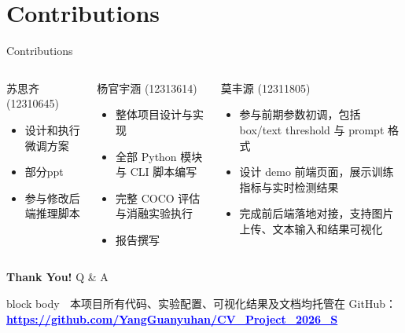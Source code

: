 \documentclass[aspectratio=169,10pt]{beamer}
\begin{document}
\section{Contributions}

\begin{frame}{Contributions}
  \begin{columns}[T]
    \begin{block}{苏思齐 (12310645)}
      \scriptsize
      \begin{itemize}\setlength{\itemsep}{2pt}
        \item 设计和执行微调方案
        \item 部分ppt
        \item 参与修改后端推理脚本
      \end{itemize}
    \end{block}

    \begin{block}{杨官宇涵 (12313614)}
      \scriptsize
      \begin{itemize}\setlength{\itemsep}{2pt}
        \item 整体项目设计与实现
        \item 全部 Python 模块与 CLI 脚本编写
        \item 完整 COCO 评估与消融实验执行
        \item 报告撰写
      \end{itemize}
    \end{block}

    \begin{block}{莫丰源 (12311805)}
      \scriptsize
      \begin{itemize}\setlength{\itemsep}{2pt}
        \item 参与前期参数初调，包括 box/text threshold 与 prompt 格式
        \item 设计 demo 前端页面，展示训练指标与实时检测结果
        \item 完成前后端落地对接，支持图片上传、文本输入和结果可视化
      \end{itemize}
    \end{block}
  \end{columns}

  \vspace{0.3cm}
  \centering
  \Large\textbf{Thank You!} \quad \normalsize Q \& A

  \vspace{0.4cm}
  \begin{beamercolorbox}[wd=0.85\textwidth,center,rounded=true,shadow=false]{block body}
    \small\textcolor{Muted}{📂 本项目所有代码、实验配置、可视化结果及文档均托管在 GitHub：}\\[0.2cm]
    \Large\textcolor{Blue}{\textbf{\underline{https://github.com/YangGuanyuhan/CV\_Project\_2026\_S}}}
  \end{beamercolorbox}
\end{frame}
\end{document}
